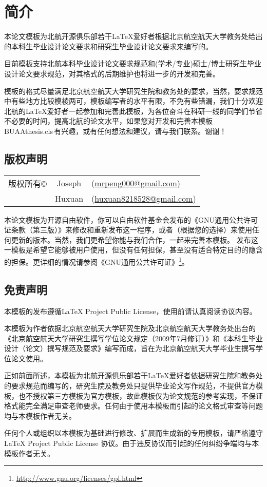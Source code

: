 \chapter{简介}
	本论文模板为北航开源俱乐部若干\LaTeX{}爱好者根据北京航空航天大学教务处给出的本科生毕业设计论文要求和研究生毕业设计论文要求来编写的。\par
	目前模板支持北航本科毕业设计论文要求规范和(学术/专业)硕士/博士研究生毕业设计论文要求规范，对其格式的后期维护也将进一步的开发和完善。\par
	模板的格式尽量满足北京航空航天大学研究生院和教务处的要求，当然，要求规范中有些地方比较模棱两可，模板编写者的水平有限，不免有些错漏，我们十分欢迎北航的\LaTeX{}爱好者一起参加和完善此模板，为各位奋斗在科研一线的同学们节省不必要的时间，提高北航的论文水平，如果您对开发和完善本模板\,BUAAthesis.cls\,有兴趣，或有任何想法和建议，请与我们联系。谢谢！
	\section{版权声明}
	\begin{tabular}{ccl}
	版权所有\copyright\qquad & Joseph\quad & (\href{mailto:mrpeng000@gmail.com}{mrpeng000@gmail.com})\\
						       ~ & Huxuan & (\href{mailto:huxuan8218528@gmail.com}{huxuan8218528@gmail.com})\\
	\end{tabular}
	\newline
\qquad 本论文模板为开源自由软件，你可以自由软件基金会发布的《GNU通用公共许可证条款（第三版）》来修改和重新发布这一程序，或者（根据您的选择）来使用任何更新的版本。当然，我们更希望你能与我们合作，一起来完善本模板。
	发布这一模板是希望它能够被用户使用，但没有任何担保，甚至没有适合特定目的的隐含的担保。更详细的情况请参阅《GNU通用公共许可证》\footnote{\url{http://www.gnu.org/licenses/gpl.html}}。

	\section{免责声明}
	本模板的发布遵循\LaTeX{} Project Public License，使用前请认真阅读协议内容。\par
	本模板为作者依据北京航空航天大学研究生院及北京航空航天大学教务处出台的《北京航空航天大学研究生撰写学位论文规定（2009年7月修订）》和《本科生毕业设计（论文）撰写规范及要求》编写而成，旨在为北京航空航天大学毕业生撰写学位论文使用。\par
	正如前面所述，本模板为北航开源俱乐部若干\LaTeX{}爱好者依据研究生院和教务处的要求规范而编写的，研究生院及教务处只提供毕业论文写作规范，不提供官方模板，也不授权第三方模板为官方模板，故此模板仅为论文规范的参考实现，不保证格式能完全满足审查老师要求。任何由于使用本模板而引起的论文格式审查等问题均与本模板作者无关。\par
	任何个人或组织以本模板为基础进行修改、扩展而生成新的专用模板，请严格遵守\LaTeX{} Project Public License 协议。由于违反协议而引起的任何纠纷争端均与本模板作者无关。
